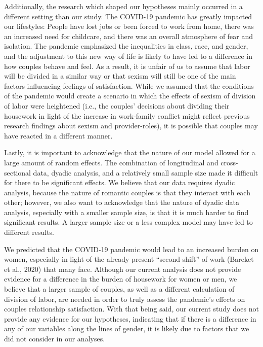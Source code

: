 \documentclass[
  english,
  man]{apa6}
\begin{document}
Additionally, the research which shaped our hypotheses mainly occurred in a different setting than our study. The COVID-19 pandemic has greatly impacted our lifestyles: People have lost jobs or been forced to work from home, there was an increased need for childcare, and there was an overall atmosphere of fear and isolation. The pandemic emphasized the inequalities in class, race, and gender, and the adjustment to this new way of life is likely to have led to a difference in how couples behave and feel. As a result, it is unfair of us to assume that labor will be divided in a similar way or that sexism will still be one of the main factors influencing feelings of satisfaction. While we assumed that the conditions of the pandemic would create a scenario in which the effects of sexism of division of labor were heightened (i.e., the couples' decisions about dividing their housework in light of the increase in work-family conflict might reflect previous research findings about sexism and provider-roles), it is possible that couples may have reacted in a different manner.

Lastly, it is important to acknowledge that the nature of our model allowed for a large amount of random effects. The combination of longitudinal and cross-sectional data, dyadic analysis, and a relatively small sample size made it difficult for there to be significant effects. We believe that our data requires dyadic analysis, because the nature of romantic couples is that they interact with each other; however, we also want to acknowledge that the nature of dyadic data analysis, especially with a smaller sample size, is that it is much harder to find significant results. A larger sample size or a less complex model may have led to different results.

We predicted that the COVID-19 pandemic would lead to an increased burden on women, especially in light of the already present \enquote{second shift} of work (Bareket et al., 2020) that many face. Although our current analysis does not provide evidence for a difference in the burden of housework for women or men, we believe that a larger sample of couples, as well as a different calculation of division of labor, are needed in order to truly assess the pandemic's effects on couples relationship satisfaction. With that being said, our current study does not provide any evidence for our hypotheses, indicating that if there is a difference in any of our variables along the lines of gender, it is likely due to factors that we did not consider in our analyses.
\end{document}

